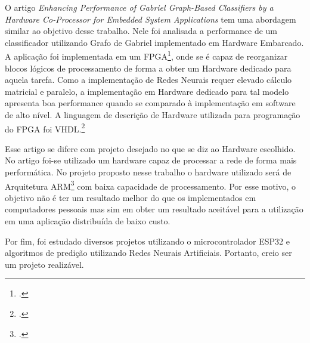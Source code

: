    O artigo \emph{Enhancing Performance of Gabriel Graph-Based Classifiers by a Hardware Co-Processor for Embedded System Applications}\cite{HardwareGabrielGraph}
tem uma abordagem similar ao objetivo desse trabalho. Nele foi analisada a performance de um classificador utilizando Grafo de Gabriel implementado em Hardware Embarcado.
A aplicação foi implementada em um FPGA\footcite{FPGA: Field-programmable gate array}, onde se é capaz de reorganizar blocos lógicos de processamento de forma a obter um Hardware dedicado 
para aquela tarefa. Como a implementação de Redes Neurais requer elevado cálculo matricial e paralelo, a implementação em Hardware dedicado para tal modelo apresenta boa performance quando se
comparado à implementação em software de alto nível. A linguagem de descrição de Hardware utilizada para programação do FPGA foi VHDL.\footcite{VHDL: VHSIC Hardware Description Language.}

Esse artigo se difere com projeto desejado no que se diz ao Hardware escolhido. No artigo foi-se utilizado um hardware capaz de processar a rede de forma mais performática. No projeto proposto
nesse trabalho o hardware utilizado será de Arquitetura ARM\footcite{ARM is a family of reduced instruction set computer (RISC) instruction set architectures for computer processors} com baixa capacidade de processamento.
Por esse motivo, o objetivo não é ter um resultado melhor do que os implementados em computadores pessoais mas sim em obter um resultado aceitável para a utilização em uma aplicação distribuída de baixo custo.

Por fim, foi estudado diversos projetos utilizando o microcontrolador ESP32 e algoritmos de predição utilizando Redes Neurais Artificiais. Portanto, creio ser um projeto realizável.

